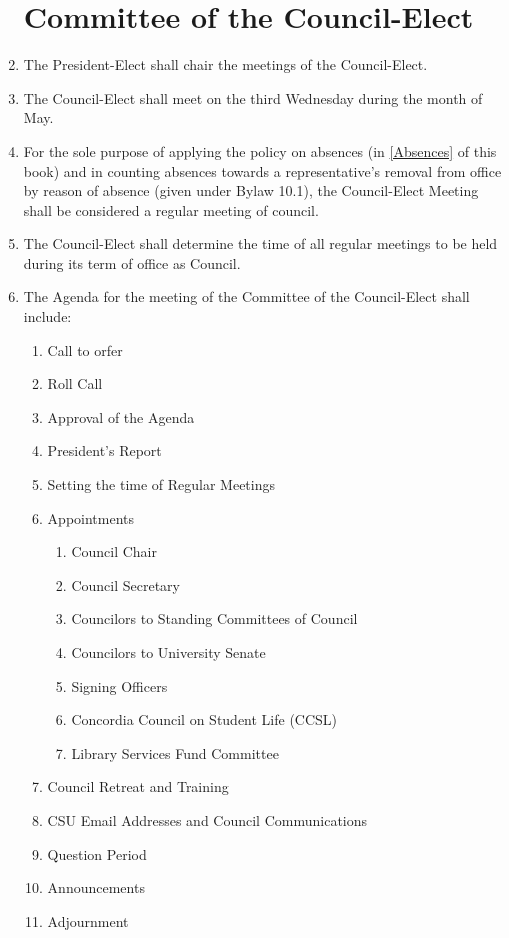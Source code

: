 \documentclass[oneside]{book}
\begin{document}
\begin{enumerate}
\section{\label{Committee_of_the_Council-Elect}Committee of the Council-Elect }
\item The President-Elect shall chair the meetings of the Council-Elect. 
\item The Council-Elect shall meet on the third Wednesday during the month
of May. 
\item For the sole purpose of applying the policy on absences (in \autoref{Absences} of this book) and in counting absences towards a representative's removal from office by reason of absence (given under Bylaw 10.1), the Council-Elect Meeting shall be considered a regular meeting of council.
\item The Council-Elect shall determine the time of all regular meetings
to be held during its term of office as Council. 
\item The Agenda for the meeting of the Committee of the Council-Elect shall include:
\begin{enumerate}
\item Call to orfer
\item Roll Call
\item Approval of the Agenda
\item President's Report
\item Setting the time of Regular Meetings
\item Appointments
\begin{enumerate}
\item Council Chair
\item Council Secretary
\item Councilors to Standing Committees of Council
\item Councilors to University Senate
\item Signing Officers
\item Concordia Council on Student Life (CCSL)
\item Library Services Fund Committee
\end{enumerate}
\item Council Retreat and Training
\item CSU Email Addresses and Council Communications
\item Question Period
\item Announcements
\item Adjournment
\end{enumerate}


\end{enumerate}
\end{document}
